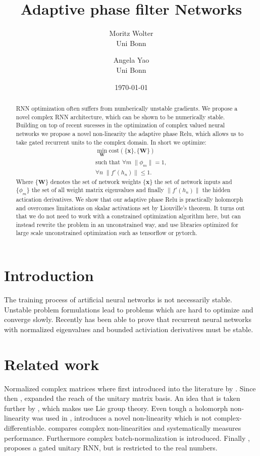 \documentclass{article}
\title{Adaptive phase filter Networks}
\author{Moritz Wolter  \\
    Uni Bonn  \\
    \and 
    Angela Yao \\
    Uni Bonn \\
    }
\date{\today}
\begin{document}
\tableofcontents
\newpage
\maketitle
\begin{abstract}
RNN optimization often suffers from numberically unstable gradients. We propose a novel complex RNN architecture, which can be shown to be numerically stable. Building on top of recent sucesses in the optimization of complex valued neural networks we propose a novel non-linearity the adaptive phase Relu, which allows us to take gated recurrent units to the complex domain. In short we optimize: 
\begin{align}
\min_{\mathbf{W}} \text{cost}(\{\mathbf{x}\}, \{\mathbf{W}\}) \\
\text{such that } \forall m \; \| \phi_m \| = 1, \\
                  \forall n \; \| f'(h_n) \| \leq 1.
\end{align}
Where $\{\mathbf{W}\}$ denotes the set of network weights $\{\mathbf{x}\}$ the set of network inputs and $\{\phi_m\}$ the set of all weight matrix eigenvalues and finally $\|f'(h_n) \|$ the hidden actication derivatives.
We show that our adaptive phase Relu is practically holomorph and overcomes limitations on skalar activations set by Liouville's theorem.
It turns out that we do not need to work with a constrained optimization algorithm here, but can instead rewrite the problem in an unconstrained way, and use libraries optimized for large scale unconstrained optimization such as tensorflow or pytorch.
\end{abstract}

\section{Introduction}
The training process of artificial neural networks is not necessarily stable. Unstable problem formulations lead to problems which are hard to optimize and converge slowly. Recently \cite{Arjovsky} has been able to prove that recurrent neural networks with normalized eigenvalues and bounded activiation derivatives must be stable. 

\section{Related work}
Normalized complex matrices where first introduced into the literature by \cite{Arjovsky}. Since then \cite{Wisdom}, expanded the reach of the unitary matrix basis. An idea that is taken further by \cite{Hyland}, which makes use Lie group theory.  
Even tough a holomorph non-linearity was used in \cite{Guberman}, \cite{Arjovsky} introduces a novel non-linearity which is not complex-differentiable. \cite{Trabelsi} compares complex non-linearities and systematically measures performance. Furthermore complex batch-normalization is introduced.
Finally \cite{Jing}, proposes a gated unitary RNN, but is restricted to the real numbers. 
\end{document}

